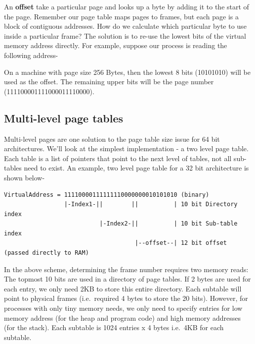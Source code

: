 \begin{wrapfig}
\end{wrapfig}

An \textbf{offset} take a particular page and looks up a byte by adding it to the start of the page. Remember our page table maps pages to frames, but each page is a block of contiguous addresses. How do we calculate which particular byte to use inside a particular frame? The solution is to re-use the lowest bits of the virtual memory address directly. For example, suppose our process is reading the following address- 

On a machine with page size 256 Bytes, then the lowest 8 bits (10101010) will be used as the offset. The remaining upper bits will be the page number (111100001111000011110000).

\subsection{Multi-level page tables}\label{multi-level-page-tables}
 Multi-level pages are one solution to the page table size issue for 64 bit architectures. We'll look at the simplest implementation - a two level page table. Each table is a list of pointers that point to the next level of tables, not all sub-tables need to exist. An example, two level page table for a 32 bit architecture is shown below-

\begin{verbatim}
VirtualAddress = 11110000111111110000000010101010 (binary)
                 |-Index1-||        ||          | 10 bit Directory index
                           |-Index2-||          | 10 bit Sub-table index
                                     |--offset--| 12 bit offset (passed directly to RAM)
\end{verbatim}

 In the above scheme, determining the frame number requires two memory reads: The topmost 10 bits are used in a directory of page tables. If 2 bytes are used for each entry, we only need 2KB to store this entire directory. Each subtable will point to physical frames (i.e.~required 4 bytes to store the 20 bits). However, for processes with only tiny memory needs, we only need to specify entries for low memory address (for the heap and program code) and high memory addresses (for the stack). Each subtable is 1024 entries x 4 bytes i.e.~4KB for each subtable.

